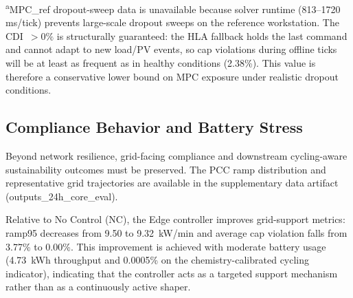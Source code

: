\documentclass[preprint,12pt]{elsarticle}
\def\texttt#1{#1}%
\begin{document}
\begin{table}[H]
\centering
\caption{Resilience Score ($R_{score}$), Compliance Degradation Index (CDI), and Cap Violation Exposure under Cyber-Physical Network Uncertainty. CDI $=$ offline cap-violation rate $-$ online cap-violation rate; CDI~$=0$ means no degradation during disconnection.}
\label{tab:resilience}
\footnotesize
\setlength{\tabcolsep}{3pt}
\vspace{4pt}
\begin{minipage}{0.97\textwidth}
\footnotesize\textsuperscript{a}\texttt{MPC\_ref} dropout-sweep data is unavailable because solver runtime (813--1720\,ms/tick) prevents large-scale dropout sweeps on the reference workstation. The CDI~$>0\%$ is structurally guaranteed: the HLA fallback holds the last command and cannot adapt to new load/PV events, so cap violations during offline ticks will be at least as frequent as in healthy conditions (2.38\%). This value is therefore a conservative lower bound on MPC exposure under realistic dropout conditions.
\end{minipage}
\end{table}

\subsection{Compliance Behavior and Battery Stress}
Beyond network resilience, grid-facing compliance and downstream cycling-aware sustainability outcomes must be preserved. The PCC ramp distribution and representative grid trajectories are available in the supplementary data artifact (\texttt{outputs\_24h\_core\_eval}).

Relative to No Control (NC), the Edge controller improves grid-support metrics: ramp95 decreases from 9.50 to 9.32~kW/min and average cap violation falls from 3.77\% to 0.00\%. This improvement is achieved with moderate battery usage (4.73~kWh throughput and 0.0005\% on the chemistry-calibrated cycling indicator), indicating that the controller acts as a targeted support mechanism rather than as a continuously active shaper.
\end{document}
